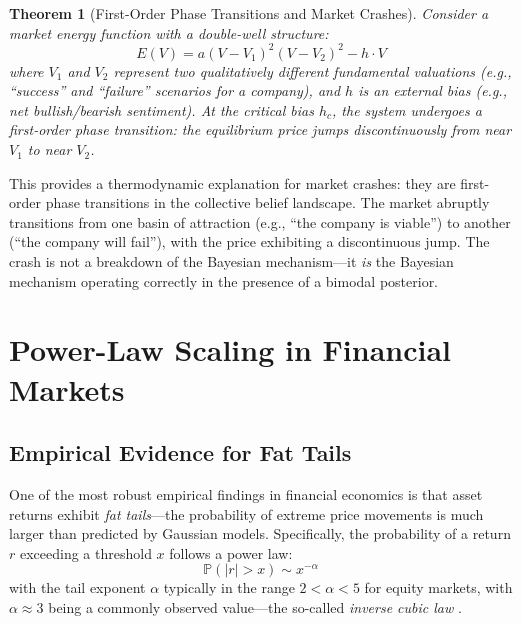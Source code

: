 \documentclass[12pt,a4paper]{article}
\newtheorem{theorem}{Theorem}[section]
\theoremstyle{definition}
\newcommand{\Prob}{\mathbb{P}}
\begin{document}
\begin{theorem}[First-Order Phase Transitions and Market Crashes]\label{thm:crash}
Consider a market energy function with a double-well structure:
\begin{equation}\label{eq:double_well}
    E(V) = a(V - V_1)^2(V - V_2)^2 - h \cdot V
\end{equation}
where $V_1$ and $V_2$ represent two qualitatively different fundamental valuations (e.g., ``success'' and ``failure'' scenarios for a company), and $h$ is an external bias (e.g., net bullish/bearish sentiment). At the critical bias $h_c$, the system undergoes a first-order phase transition: the equilibrium price jumps discontinuously from near $V_1$ to near $V_2$.
\end{theorem}

This provides a thermodynamic explanation for market crashes: they are first-order phase transitions in the collective belief landscape. The market abruptly transitions from one basin of attraction (e.g., ``the company is viable'') to another (``the company will fail''), with the price exhibiting a discontinuous jump. The crash is not a breakdown of the Bayesian mechanism---it \emph{is} the Bayesian mechanism operating correctly in the presence of a bimodal posterior.



\section{Power-Law Scaling in Financial Markets}\label{sec:power_laws}

\subsection{Empirical Evidence for Fat Tails}

One of the most robust empirical findings in financial economics is that asset returns exhibit \emph{fat tails}---the probability of extreme price movements is much larger than predicted by Gaussian models. Specifically, the probability of a return $r$ exceeding a threshold $x$ follows a power law:
\begin{equation}\label{eq:power_law}
    \Prob(|r| > x) \sim x^{-\alpha}
\end{equation}
with the tail exponent $\alpha$ typically in the range $2 < \alpha < 5$ for equity markets, with $\alpha \approx 3$ being a commonly observed value---the so-called \emph{inverse cubic law} \citep{gopikrishnan1999,gabaix2003}.
\end{document}
